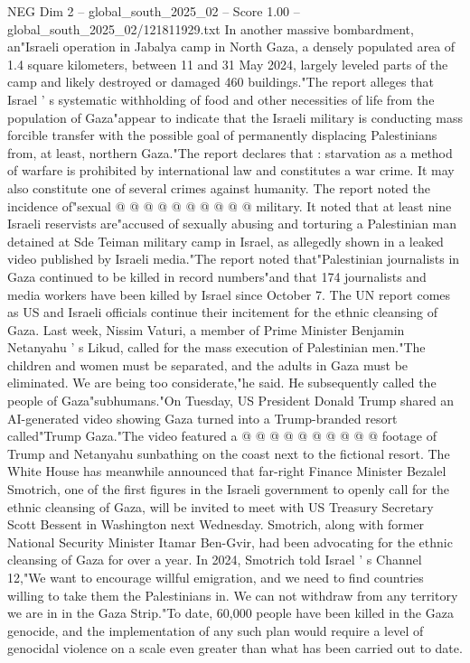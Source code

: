\begin{textsample}{NEG Dim 2 – global\_south\_2025\_02 – Score 1.00 – global\_south\_2025\_02/121811929.txt}
In another massive bombardment, an"Israeli operation in Jabalya camp in North Gaza, a densely populated area of 1.4 square kilometers, between 11 and 31 May 2024, largely leveled parts of the camp and likely destroyed or damaged 460 buildings."The report alleges that Israel ' s systematic withholding of food and other necessities of life from the population of Gaza"appear to indicate that the Israeli military is conducting mass forcible transfer with the possible goal of permanently displacing Palestinians from, at least, northern Gaza."The report declares that : starvation as a method of warfare is prohibited by international law and constitutes a war crime.
It may also constitute one of several crimes against humanity.
The report noted the incidence of"sexual @ @ @ @ @ @ @ @ @ @ military.
It noted that at least nine Israeli reservists are"accused of sexually abusing and torturing a Palestinian man detained at Sde Teiman military camp in Israel, as allegedly shown in a leaked video published by Israeli media."The report noted that"Palestinian journalists in Gaza continued to be killed in record numbers"and that 174 journalists and media workers have been killed by Israel since October 7.
The UN report comes as US and Israeli officials continue their incitement for the ethnic cleansing of Gaza.
Last week, Nissim Vaturi, a member of Prime Minister Benjamin Netanyahu ' s Likud, called for the mass execution of Palestinian men."The children and women must be separated, and the adults in Gaza must be eliminated.
We are being too considerate,"he said.
He subsequently called the people of Gaza"subhumans."On Tuesday, US President Donald Trump shared an AI-generated video showing Gaza turned into a Trump-branded resort called"Trump Gaza."The video featured a @ @ @ @ @ @ @ @ @ @ footage of Trump and Netanyahu sunbathing on the coast next to the fictional resort.
The White House has meanwhile announced that far-right Finance Minister Bezalel Smotrich, one of the first figures in the Israeli government to openly call for the ethnic cleansing of Gaza, will be invited to meet with US Treasury Secretary Scott Bessent in Washington next Wednesday.
Smotrich, along with former National Security Minister Itamar Ben-Gvir, had been advocating for the ethnic cleansing of Gaza for over a year.
In 2024, Smotrich told Israel ' s Channel 12,"We want to encourage willful emigration, and we need to find countries willing to take them the Palestinians in.
We can not withdraw from any territory we are in in the Gaza Strip."To date, 60,000 people have been killed in the Gaza genocide, and the implementation of any such plan would require a level of genocidal violence on a scale even greater than what has been carried out to date.

\end{textsample}
